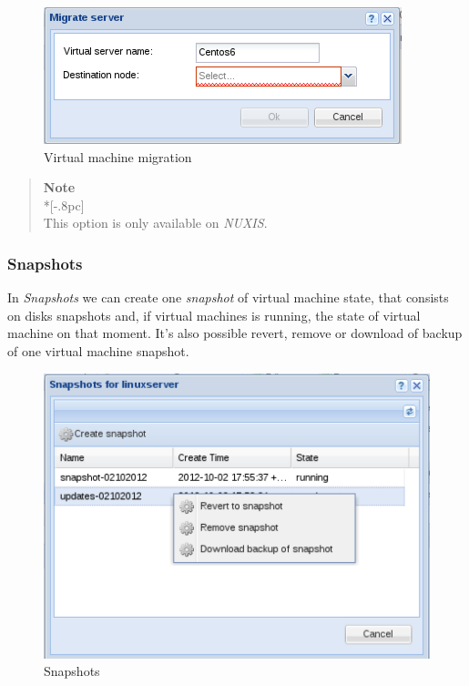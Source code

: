 \begin{figure}[H]
	\begin{center}
	\includegraphics[scale=0.5]{screenshots/server_migrate.png}
	\caption{Virtual machine migration}
	\label{fig:server_migrate}
	\end{center}
\end{figure}

\begin{quote}
	{\large \bf Note} \\*[-.8pc]
	\underline{\hspace{6in}} \\
	This option is only available on \emph{NUXIS}.
\end{quote}

\subsubsection{Snapshots}
\label{sec:server_snapshots}

In \emph{Snapshots} we can create one \emph{snapshot} of virtual machine state, that consists on disks snapshots and, if virtual machines is running, the state of virtual machine on that moment.
It's also possible revert, remove or download of backup of one virtual machine snapshot.

\begin{figure}[H]
	\begin{center}
	\includegraphics[scale=0.5]{screenshots/server_snapshots.png}
	\caption{Snapshots}
	\label{fig:server_snapshots}
	\end{center}
\end{figure}

